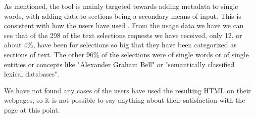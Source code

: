 As mentioned, the tool is mainly targeted towards adding metadata to single words, with adding data to sections being
a secondary means of input.
This is consistent with how the users have used \theartefact.
From the usage data we have we can see that of the 298 of the text selections requests we have received,
only 12, or about 4\%, have been for selections so big that they have been categorized as sections of text.
The other 96\% of the selections were of single words or of single entities or concepts like "Alexander Graham Bell" or
"semantically classified lexical databases".

We have not found any cases of the users have used the resulting HTML on their webpages,
so it is not possible to say anything about their satisfaction with the page at this point.
